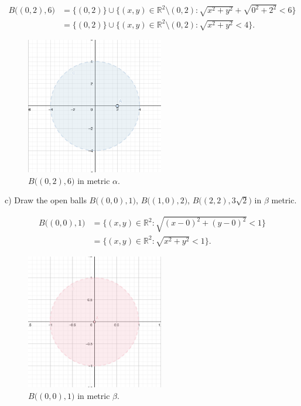 \documentclass[a4paper,11pt]{article}
\begin{document}

 \begin{align*} 
    B \big((0, 2), 6 \big) &= \{(0,2)\} \cup \{(x,y) \in \mathbb{R}^2 \setminus (0,2) : \sqrt{x^2 + y^2} + \sqrt{0^2 + 2^2} < 6 \} 
    \\
    &= \{(0,2)\} \cup \{(x,y) \in \mathbb{R}^2 \setminus (0,2) : \sqrt{x^2 + y^2} < 4 \}. 
\end{align*}

\begin{figure}[ht!]
    \centering
    \includegraphics[width=60mm]{b3.png}
    \caption{$B \big((0, 2), 6 \big)$ in metric $\alpha$.}
\end{figure}

c) Draw the open balls $B \big((0, 0), 1 \big)$, $B \big((1, 0), 2 \big)$, $B \big((2, 2), 3 \sqrt{2} \big)$ in $\beta$ metric. 

\begin{align*} 
    B \big((0, 0), 1 \big) &= \{(x,y) \in \mathbb{R}^2 : \sqrt{(x - 0)^2 + (y - 0)^2} < 1 \}
    \\
    &= \{(x,y) \in \mathbb{R}^2 : \sqrt{x^2 + y^2} < 1 \}.
\end{align*}

\begin{figure}[ht!]
    \centering
    \includegraphics[width=60mm]{b1.png}
    \caption{$B \big((0, 0), 1 \big)$ in metric $\beta$.}
\end{figure}
\end{document}
